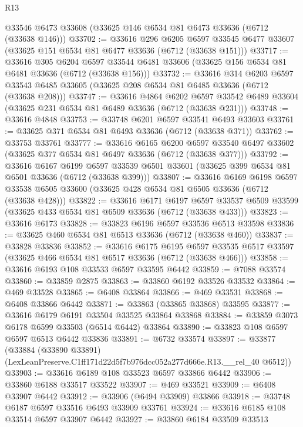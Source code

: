 \begin{lexlean}{R13}
\begin{coremodule}
    @33546
    @6473
    @33608
    (@33625 @146 @6534 @81 @6473 @33636 (@6712 (@33638 @146)))
@33702 := @33616
    @296
    @6205
    @6597
    @33545
    @6477
    @33607
    (@33625 @151 @6534 @81 @6477 @33636 (@6712 (@33638 @151)))
@33717 := @33616
    @305
    @6204
    @6597
    @33544
    @6481
    @33606
    (@33625 @156 @6534 @81 @6481 @33636 (@6712 (@33638 @156)))
@33732 := @33616
    @314
    @6203
    @6597
    @33543
    @6485
    @33605
    (@33625 @208 @6534 @81 @6485 @33636 (@6712 (@33638 @208)))
@33747 := @33616
    @4864
    @6202
    @6597
    @33542
    @6489
    @33604
    (@33625 @231 @6534 @81 @6489 @33636 (@6712 (@33638 @231)))
@33748 := @33616 @4848
@33753 := @33748 @6201 @6597 @33541 @6493 @33603
@33761 := @33625 @371 @6534 @81 @6493 @33636 (@6712 (@33638 @371))
@33762 := @33753 @33761
@33777 := @33616
    @6165
    @6200
    @6597
    @33540
    @6497
    @33602
    (@33625 @377 @6534 @81 @6497 @33636 (@6712 (@33638 @377)))
@33792 := @33616
    @6167
    @6199
    @6597
    @33539
    @6501
    @33601
    (@33625 @399 @6534 @81 @6501 @33636 (@6712 (@33638 @399)))
@33807 := @33616
    @6169
    @6198
    @6597
    @33538
    @6505
    @33600
    (@33625 @428 @6534 @81 @6505 @33636 (@6712 (@33638 @428)))
@33822 := @33616
    @6171
    @6197
    @6597
    @33537
    @6509
    @33599
    (@33625 @433 @6534 @81 @6509 @33636 (@6712 (@33638 @433)))
@33823 := @33616 @6173
@33828 := @33823 @6196 @6597 @33536 @6513 @33598
@33836 := @33625 @460 @6534 @81 @6513 @33636 (@6712 (@33638 @460))
@33837 := @33828 @33836
@33852 := @33616
    @6175
    @6195
    @6597
    @33535
    @6517
    @33597
    (@33625 @466 @6534 @81 @6517 @33636 (@6712 (@33638 @466)))
@33858 := @33616 @6193 @108 @33533 @6597 @33595 @6442
@33859 := @7088 @33574
@33860 := @33859 @2875
@33863 := @33860 @6192 @33526 @33532
@33864 := @469 @33528
@33865 := @6408 @33864
@33866 := @469 @33531
@33868 := @6408 @33866 @6442
@33871 := @33863 (@33865 @33868) @33595
@33877 := @33616 @6179 @6191 @33504 @33525 @33864 @33868
@33884 := @33859 @3073 @6178 @6599 @33503 (@6514 @6442) @33864
@33890 := @33823 @108 @6597 @6597 @6513 @6442 @33836
@33891 := @6732 @33574
@33897 := @33877
    (@33884 (@33890 @33891) (LexLeanPreserve.C1ff171d22d5f7b976dcc052a277d666e.R13.__rel_40 @6512))
@33903 := @33616 @6189 @108 @33523 @6597 @33866 @6442
@33906 := @33860 @6188 @33517 @33522
@33907 := @469 @33521
@33909 := @6408 @33907 @6442
@33912 := @33906 (@6494 @33909) @33866
@33918 := @33748 @6187 @6597 @33516 @6493 @33909 @33761
@33924 := @33616 @6185 @108 @33514 @6597 @33907 @6442
@33927 := @33860 @6184 @33509 @33513

\end{coremodule}
\end{lexlean}
